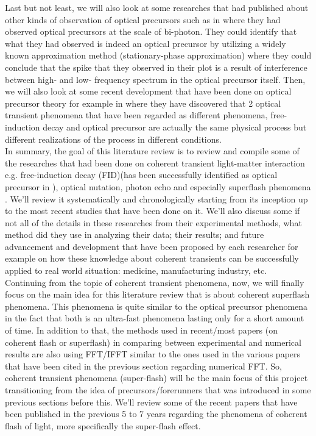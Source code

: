 Last but not least, we will also look at some researches that had published about other kinds of observation of optical precursors such as in \cite{Du2008} where they had observed optical precursors at the scale of bi-photon. They could identify that what they had observed is indeed an optical precursor by utilizing a widely known approximation method (stationary-phase approximation) where they could conclude that the spike that they observed in their plot is a result of interference between high- and low- frequency spectrum in the optical precursor itself. Then, we will also look at some recent development that have been done on optical precursor theory for example in \cite{Chen2010} where they have discovered that 2 optical transient phenomena that have been regarded as different phenomena, free-induction decay and optical precursor are actually the same physical process  but different realizations of the process in different conditions.\\

In summary, the goal of this literature review is to review and compile some of the researches that had been done on coherent transient light-matter interaction e.g. free-induction decay (FID)(has been successfully identified as optical precursor in \cite{Chen2010}), optical nutation, photon echo and especially superflash phenomena \cite{Kwong2014}. We'll review it systematically and chronologically starting from its inception up to the most recent studies that have been done on it. We'll also discuss some if not all of the details in these researches from their experimental methods, what method did they use in analyzing their data; their results; and future advancement and development that have been proposed by each researcher for example on how these knowledge about coherent transients can be successfully applied to real world situation: medicine, manufacturing industry, etc.\\

Continuing from the topic of coherent transient phenomena, now, we will finally focus on the main idea for this literature review that is about coherent superflash phenomena. This phenomena is quite similar to the optical precursor phenomena in the fact that both is an ultra-fast phenomena lasting only for a short amount of time. In addition to that, the methods used in recent/most papers (on coherent flash or superflash) in comparing between experimental and numerical results are also using FFT/IFFT similar to the ones used in the various papers that have been cited in the previous section regarding numerical FFT. So, coherent transient phenomena (super-flash) will be the main focus of this project transitioning from the idea of precursors/forerunners that was introduced in some previous sections before this. We'll review some of the recent papers that have been published in the previous 5 to 7 years regarding the phenomena of coherent flash of light, more specifically the super-flash effect.\\


